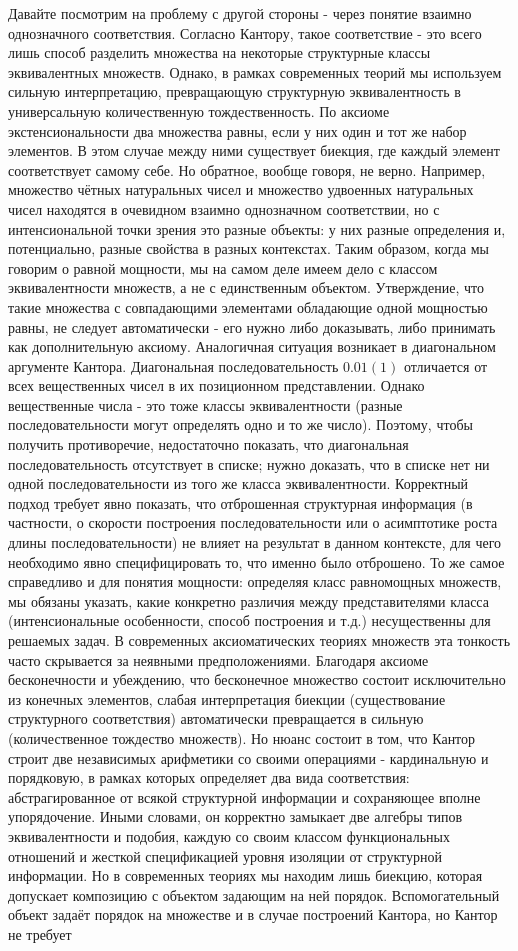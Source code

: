 \documentclass[12pt]{article}
\begin{document}
Давайте посмотрим на проблему с другой стороны - через понятие взаимно однозначного соответствия. Согласно Кантору, такое соответствие - это всего лишь способ разделить множества на некоторые структурные классы эквивалентных множеств. Однако, в рамках современных теорий мы используем сильную интерпретацию, превращающую структурную эквивалентность в универсальную количественную тождественность. По аксиоме экстенсиональности два множества равны, если у них один и тот же набор элементов. В этом случае между ними существует биекция, где каждый элемент соответствует самому себе. Но обратное, вообще говоря, не верно. Например, множество чётных натуральных чисел и множество удвоенных натуральных чисел находятся в очевидном взаимно однозначном соответствии, но с интенсиональной точки зрения это разные объекты: у них разные определения и, потенциально, разные свойства в разных контекстах. Таким образом, когда мы говорим о равной мощности, мы на самом деле имеем дело с классом эквивалентности множеств, а не с единственным объектом. Утверждение, что такие множества с совпадающими элементами обладающие одной мощностью равны, не следует автоматически - его нужно либо доказывать, либо принимать как дополнительную аксиому. Аналогичная ситуация возникает в диагональном аргументе Кантора. Диагональная последовательность $0.01(1)$ отличается от всех вещественных чисел в их позиционном представлении. Однако вещественные числа - это тоже классы эквивалентности (разные последовательности могут определять одно и то же число). Поэтому, чтобы получить противоречие, недостаточно показать, что диагональная последовательность отсутствует в списке; нужно доказать, что в списке нет ни одной последовательности из того же класса эквивалентности. Корректный подход требует явно показать, что отброшенная структурная информация (в частности, о скорости построения последовательности или о асимптотике роста длины последовательности) не влияет на результат в данном контексте, для чего необходимо явно специфицировать то, что именно было отброшено. То же самое справедливо и для понятия мощности: определяя класс равномощных множеств, мы обязаны указать, какие конкретно различия между представителями класса (интенсиональные особенности, способ построения и т.д.) несущественны для решаемых задач. В современных аксиоматических теориях множеств эта тонкость часто скрывается за неявными предположениями. Благодаря аксиоме бесконечности и убеждению, что бесконечное множество состоит исключительно из конечных элементов, слабая интерпретация биекции (существование структурного соответствия) автоматически превращается в сильную (количественное тождество множеств). Но нюанс состоит в том, что Кантор строит две независимых арифметики со своими операциями - кардинальную и порядковую, в рамках которых определяет два вида соответствия: абстрагированное от всякой структурной информации и сохраняющее вполне упорядочение. Иными словами, он корректно замыкает две алгебры типов эквивалентности и подобия, каждую со своим классом функциональных отношений и жесткой спецификацией уровня изоляции от структурной информации. Но в современных теориях мы находим лишь биекцию, которая допускает композицию с объектом задающим на ней порядок. Вспомогательный объект задаёт порядок на множестве и в случае построений Кантора, но Кантор не требует 
\end{document}
